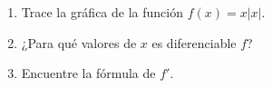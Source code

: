 \item 
    \begin{enumerate}
        \item Trace la gráfica de la función $f(x) = x|x|$.
        \item ¿Para qué valores de $x$ es diferenciable $f$?
        \item Encuentre la fórmula de $f'$.
    \end{enumerate}
